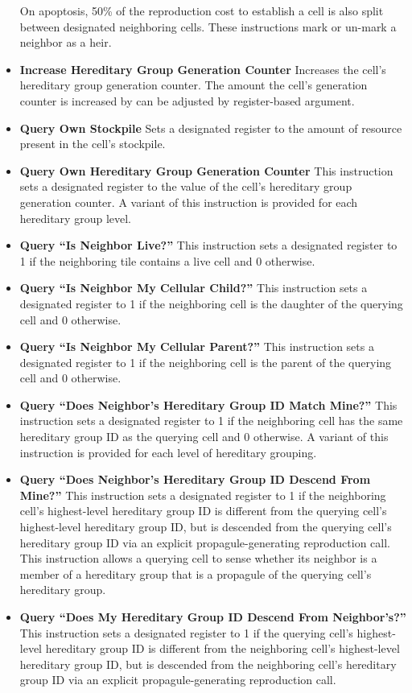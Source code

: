\begin{itemize}
On apoptosis, 50\% of the reproduction cost to establish a cell is also split between designated neighboring cells.
These instructions mark or un-mark a neighbor as a heir.
\item \textbf{Increase Hereditary Group Generation Counter}
Increases the cell's hereditary group generation counter.
The amount the cell's generation counter is increased by can be adjusted by register-based argument.
\item \textbf{Query Own Stockpile}
Sets a designated register to the amount of resource present in the cell's stockpile.
\item \textbf{Query Own Hereditary Group Generation Counter}
This instruction sets a designated register to the value of the cell's hereditary group generation counter.
A variant of this instruction is provided for each hereditary group level.
\item \textbf{Query ``Is Neighbor Live?''}
This instruction sets a designated register to 1 if the neighboring tile contains a live cell and 0 otherwise.
\item \textbf{Query ``Is Neighbor My Cellular Child?''}
This instruction sets a designated register to 1 if the neighboring cell is the daughter of the querying cell and 0 otherwise.
\item \textbf{Query ``Is Neighbor My Cellular Parent?''}
This instruction sets a designated register to 1 if the neighboring cell is the parent of the querying cell and 0 otherwise.
\item \textbf{Query ``Does Neighbor's Hereditary Group ID Match Mine?''}
This instruction sets a designated register to 1 if the neighboring cell has the same hereditary group ID as the querying cell and 0 otherwise.
A variant of this instruction is provided for each level of hereditary grouping.
\item \textbf{Query ``Does Neighbor's Hereditary Group ID Descend From Mine?''}
This instruction sets a designated register to 1 if the neighboring cell's highest-level hereditary group ID is different from the querying cell's highest-level hereditary group ID, but is descended from the querying cell's hereditary group ID via an explicit propagule-generating reproduction call.
This instruction allows a querying cell to sense whether its neighbor is a member of a hereditary group that is a propagule of the querying cell's hereditary group.
\item \textbf{Query ``Does My Hereditary Group ID Descend From Neighbor's?''}
This instruction sets a designated register to 1 if the querying cell's highest-level hereditary group ID is different from the neighboring cell's highest-level hereditary group ID, but is descended from the neighboring cell's hereditary group ID  via an explicit propagule-generating reproduction call.

\end{itemize}
